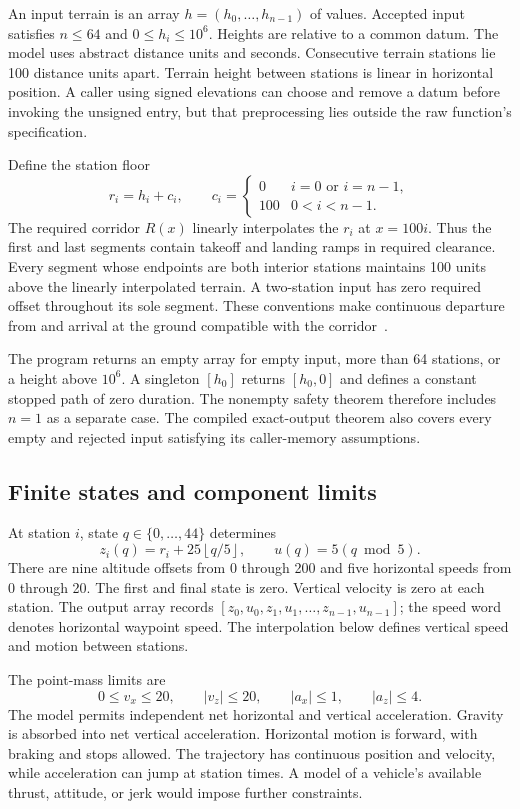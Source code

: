 \documentclass[11pt]{article}
\begin{document}
An input terrain is an array $h=(h_0,\ldots,h_{n-1})$ of  values.  Accepted input satisfies $n\leq64$ and $0\leq h_i\leq10^6$.  Heights are relative to a common datum.  The model uses abstract distance units and seconds.  Consecutive terrain stations lie 100 distance units apart.  Terrain height between stations is linear in horizontal position.  A caller using signed elevations can choose and remove a datum before invoking the unsigned entry, but that preprocessing lies outside the raw function's specification.

Define the station floor
\[
 r_i=h_i+c_i,\qquad
 c_i=\begin{cases}0&i=0\text{ or }i=n-1,\\100&0<i<n-1.\end{cases}
\]
The required corridor $R(x)$ linearly interpolates the $r_i$ at $x=100i$.  Thus the first and last segments contain takeoff and landing ramps in required clearance.  Every segment whose endpoints are both interior stations maintains 100 units above the linearly interpolated terrain.  A two-station input has zero required offset throughout its sole segment.  These conventions make continuous departure from and arrival at the ground compatible with the corridor~\cite{drone-source,drone-proofs}.

The program returns an empty array for empty input, more than 64 stations, or a height above $10^6$.  A singleton $[h_0]$ returns $[h_0,0]$ and defines a constant stopped path of zero duration.  The nonempty safety theorem therefore includes $n=1$ as a separate case.  The compiled exact-output theorem also covers every empty and rejected input satisfying its caller-memory assumptions.

\subsection{Finite states and component limits}

At station $i$, state $q\in\{0,\ldots,44\}$ determines
\[
 z_i(q)=r_i+25\left\lfloor q/5\right\rfloor,
 \qquad u(q)=5(q\bmod5).
\]
There are nine altitude offsets from 0 through 200 and five horizontal speeds from 0 through 20.  The first and final state is zero.  Vertical velocity is zero at each station.  The output array records $[z_0,u_0,z_1,u_1,\ldots,z_{n-1},u_{n-1}]$; the speed word denotes horizontal waypoint speed.  The interpolation below defines vertical speed and motion between stations.

The point-mass limits are
\[
 0\leq v_x\leq20,\qquad |v_z|\leq20,\qquad
 |a_x|\leq1,\qquad |a_z|\leq4.
\]
The model permits independent net horizontal and vertical acceleration.  Gravity is absorbed into net vertical acceleration.  Horizontal motion is forward, with braking and stops allowed.  The trajectory has continuous position and velocity, while acceleration can jump at station times.  A model of a vehicle's available thrust, attitude, or jerk would impose further constraints.
\end{document}
